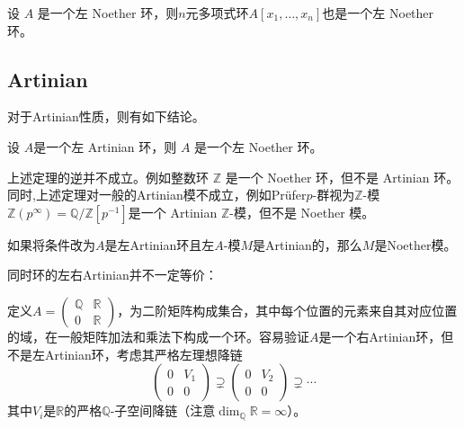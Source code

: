 \documentclass[12pt,a4paper]{ctexrep}   %
\begin{document}
\begin{theorem}[Hilbert基底定理]
    设 $A$ 是一个左 Noether 环，则$n$元多项式环$A[x_1,\dots,x_n]$也是一个左 Noether 环。
\end{theorem}
\subsection{Artinian}
对于Artinian性质，则有如下结论。
\begin{theorem}
    \label{thm:Akizuki-Hopkins-Levitzki}
    设 $A$是一个左 Artinian 环，则 $A$ 是一个左 Noether 环。
\end{theorem}
\begin{remark}
    上述定理的逆并不成立。例如整数环 $\mathbb{Z}$ 是一个 Noether 环，但不是 Artinian 环。
    同时,上述定理对一般的Artinian模不成立，例如Prüfer$p$-群视为$\mathbb{Z}$-模 $\mathbb{Z}(p^\infty) = \mathbb{Q}/\mathbb{Z}[p^{-1}]$是一个 Artinian $\mathbb{Z}$-模，但不是 Noether 模。
\end{remark}
\begin{remark}
    如果将条件改为$A$是左Artinian环且左$A$-模$M$是Artinian的，那么$M$是Noether模。
\end{remark}
同时环的左右Artinian并不一定等价：
\begin{example}
    定义$A=\left(\begin{matrix}
                \mathbb{Q} & \mathbb{R} \\
                0          & \mathbb{R}
            \end{matrix}\right)$，为二阶矩阵构成集合，其中每个位置的元素来自其对应位置的域，在一般矩阵加法和乘法下构成一个环。容易验证$A$是一个右Artinian环，但不是左Artinian环，考虑其严格左理想降链
    \begin{equation*}
        \left(\begin{matrix}
            0 & V_1 \\
            0 & 0
        \end{matrix}\right) \supsetneq \left(\begin{matrix}
            0 & V_{2} \\
            0 & 0
        \end{matrix}\right) \supsetneq \cdots
    \end{equation*}
    其中$V_i$是$\mathbb{R}$的严格$\mathbb{Q}$-子空间降链（注意$\dim_\mathbb{Q} \mathbb{R} = \infty$）。
\end{example}
\end{document}
